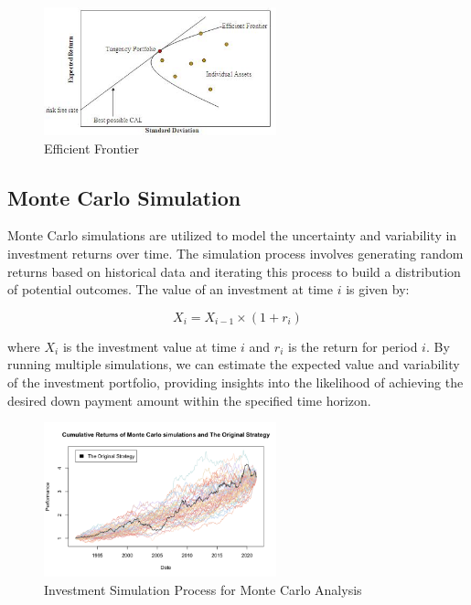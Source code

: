 \begin{figure}[h!]
    \centering
    \includegraphics[width=0.6\textwidth]{../Figures/efficient_frontier.png}
    \caption{Efficient Frontier}
    \label{fig:efficient_frontier}
\end{figure}

\subsection{Monte Carlo Simulation}
Monte Carlo simulations are utilized to model the uncertainty and variability in investment returns over time. The simulation process involves generating random returns based on historical data and iterating this process to build a distribution of potential outcomes. The value of an investment at time $i$ is given by:

\begin{equation}
X_i = X_{i-1} \times (1 + r_i)
\end{equation}

where $X_i$ is the investment value at time $i$ and $r_i$ is the return for period $i$. By running multiple simulations, we can estimate the expected value and variability of the investment portfolio, providing insights into the likelihood of achieving the desired down payment amount within the specified time horizon.

\begin{figure}[h!]
    \centering
    \includegraphics[width=0.6\textwidth]{../Figures/investment_simulation_process.png}
    \caption{Investment Simulation Process for Monte Carlo Analysis}
    \label{fig:investment_simulation}
\end{figure}

\newpage
